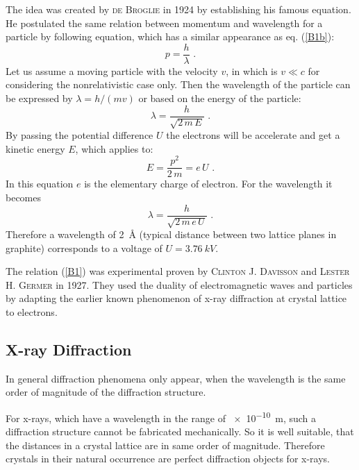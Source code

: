 \documentclass{tudphygp_eng}
\begin{document}
The idea was created by \textsc{de Broglie} in 1924 by establishing his famous equation. He postulated the same relation between momentum and wavelength for a particle by following equation, which has a similar appearance as eq. (\ref{B1b}):
\begin{equation}
p=\frac{h}{\lambda}\,\,.\label{B1}
\end{equation}
Let us assume a moving particle with the velocity $v$, in which is $v\ll c$ for considering the nonrelativistic case only. Then the wavelength of the particle can be expressed by $\lambda=h/(mv)$ or based on the energy of the particle:
\begin{equation}
\lambda=\frac{h}{\sqrt{2\,m\,E}}\,\,.
\end{equation}
By passing the potential difference $U$ the electrons will be accelerate and get a kinetic energy $E$, which applies to:
\begin{equation}
E=\frac{p^2}{2\,m}=e\,U\,\,.
\end{equation}
In this equation $e$ is the elementary charge of electron. For the wavelength it becomes 
\begin{equation}
\lambda=\frac{h}{\sqrt{2\,m\,e\,U}}\,\,.
\end{equation}
Therefore a wavelength of \SI{2}{\AA} (typical distance between two lattice planes in graphite) corresponds to a voltage of $U=\SI{3,76}{kV}$.

The relation (\ref{B1}) was experimental proven by \textsc{Clinton J. Davisson} and \textsc{Lester H. Germer} in 1927. They used the duality of electromagnetic waves and particles by adapting the earlier known phenomenon of x-ray diffraction at crystal lattice to electrons.

\subsection{X-ray Diffraction}
In general diffraction phenomena only appear, when the wavelength is the same order of magnitude of the diffraction structure.  

For x-rays, which have a wavelength in the range of \SI{e-10}{m}, such a diffraction structure cannot be fabricated mechanically. So it is well suitable, that the distances in a crystal lattice are in same order of magnitude. Therefore crystals in their natural occurrence are perfect diffraction objects for x-rays. 
 
\end{document}
